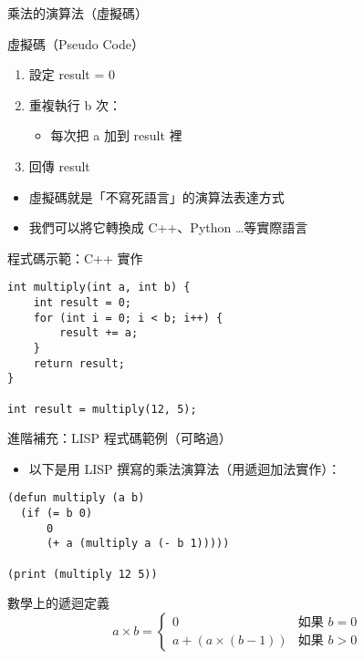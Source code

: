 \documentclass{beamer}
\begin{document}
\begin{frame}{乘法的演算法（虛擬碼）}
\begin{block}{虛擬碼（Pseudo Code）}
\begin{enumerate}
    \item 設定 result = 0
    \item 重複執行 b 次：
    \begin{itemize}
        \item 每次把 a 加到 result 裡
    \end{itemize}
    \item 回傳 result
\end{enumerate}
\end{block}

\vspace{1em}
\begin{itemize}
    \item 虛擬碼就是「不寫死語言」的演算法表達方式
    \item 我們可以將它轉換成 C++、Python …等實際語言
\end{itemize}
\end{frame}

\begin{frame}[fragile]{程式碼示範：C++ 實作}
\vspace{-0.5em}
\begin{lstlisting}[style=cppstyle]
int multiply(int a, int b) {
    int result = 0;
    for (int i = 0; i < b; i++) {
        result += a;
    }
    return result;
}

int result = multiply(12, 5);
\end{lstlisting}
\end{frame}

\begin{frame}[fragile]{進階補充：LISP 程式碼範例（可略過）}
\begin{itemize}
    \item 以下是用 LISP 撰寫的乘法演算法（用遞迴加法實作）：
\end{itemize}

\vspace{0.5em}
\begin{lstlisting}[style=lispstyle]
(defun multiply (a b)
  (if (= b 0)
      0
      (+ a (multiply a (- b 1)))))

(print (multiply 12 5))
\end{lstlisting}

\vspace{1em}
\begin{block}{數學上的遞迴定義}
\[
a \times b =
\begin{cases}
0 & \text{如果 } b = 0 \\
a + (a \times (b - 1)) & \text{如果 } b > 0
\end{cases}
\]
\end{block}
\end{frame}
\end{document}
